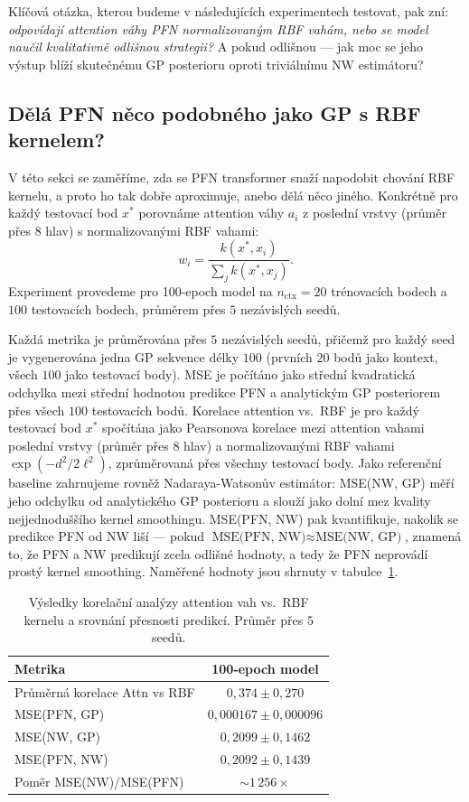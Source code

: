 Klíčová otázka, kterou budeme v následujících experimentech testovat, pak zní: \textit{odpovídají attention váhy PFN normalizovaným RBF vahám, nebo se model naučil kvalitativně odlišnou strategii?}
A pokud odlišnou — jak moc se jeho výstup blíží skutečnému GP posterioru oproti triviálnímu NW estimátoru?

\subsection{Dělá PFN něco podobného jako GP s RBF kernelem?}

V této sekci se zaměříme, zda se PFN transformer snaží napodobit chování RBF kernelu, a proto ho tak dobře aproximuje, anebo dělá něco jiného.
Konkrétně pro každý testovací bod $x^*$ porovnáme attention váhy $a_i$ z poslední vrstvy (průměr přes $8$ hlav) s normalizovanými RBF vahami:
$$w_i = \frac{k(x^*, x_i)}{\sum_j k(x^*, x_j)}.$$
Experiment provedeme pro 100-epoch model na $n_{\text{ctx}} = 20$ trénovacích bodech a $100$ testovacích bodech, průměrem přes $5$ nezávislých seedů.
\par

Každá metrika je průměrována přes $5$ nezávislých seedů, přičemž pro každý seed je vygenerována jedna GP sekvence délky $100$ (prvních $20$ bodů jako kontext, všech $100$ jako testovací body).
MSE je počítáno jako střední kvadratická odchylka mezi střední hodnotou predikce PFN a analytickým GP posteriorem přes všech $100$ testovacích bodů.
Korelace attention vs.\ RBF je pro každý testovací bod $x^*$ spočítána jako Pearsonova korelace mezi attention vahami poslední vrstvy (průměr přes $8$ hlav) a normalizovanými RBF vahami $\exp(-d^2/2\ell^2)$, zprůměrovaná přes všechny testovací body.
Jako referenční baseline zahrnujeme rovněž Nadaraya-Watsonův estimátor: \textrm{MSE(NW, GP)} měří jeho odchylku od analytického GP posterioru a slouží jako dolní mez kvality nejjednoduššího kernel smoothingu.
\textrm{MSE(PFN, NW)} pak kvantifikuje, nakolik se predikce PFN od NW liší — pokud $\textrm{MSE(PFN, NW)} \approx \textrm{MSE(NW, GP)}$, znamená to, že PFN a NW predikují zcela odlišné hodnoty, a tedy že PFN neprovádí prostý kernel smoothing.
Naměřené hodnoty jsou shrnuty v tabulce~\ref{tab:exp3}.

\begin{table}[htbp]
\centering
\begin{tabular}{lc}
\hline
\textbf{Metrika} & \textbf{100-epoch model} \\
\hline
Průměrná korelace Attn vs RBF & $0{,}374 \pm 0{,}270$ \\
MSE(PFN, GP)  & $0{,}000167 \pm 0{,}000096$ \\
MSE(NW, GP)   & $0{,}2099 \pm 0{,}1462$ \\
MSE(PFN, NW)  & $0{,}2092 \pm 0{,}1439$ \\
Poměr MSE(NW)/MSE(PFN) & ${\sim}1\,256\times$ \\
\hline
\end{tabular}
\caption{Výsledky korelační analýzy attention vah vs.\ RBF kernelu a srovnání přesnosti predikcí. Průměr přes $5$ seedů.}
\label{tab:exp3}
\end{table}

